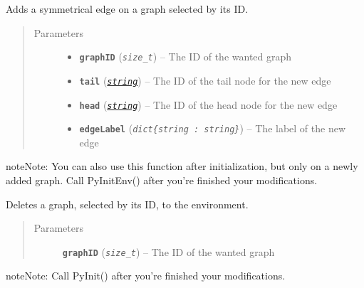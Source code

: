 \documentclass[letterpaper,10pt,english]{sphinxmanual}
\begin{document}
\begin{fulllineitems}
\label{doc:PythonGedLib.PyAddSymmetricalEdge}
Adds a symmetrical edge on a graph selected by its ID.
\begin{quote}\begin{description}
\item[{Parameters}] \leavevmode\begin{itemize}
\item {} 
\textbf{\texttt{graphID}} (\emph{\texttt{size\_t}}) -- The ID of the wanted graph

\item {} 
\textbf{\texttt{tail}} (\href{https://docs.python.org/3/library/string.html\#module-string}{\emph{\texttt{string}}}) -- The ID of the tail node for the new edge

\item {} 
\textbf{\texttt{head}} (\href{https://docs.python.org/3/library/string.html\#module-string}{\emph{\texttt{string}}}) -- The ID of the head node for the new edge

\item {} 
\textbf{\texttt{edgeLabel}} (\emph{\texttt{dict\{string : string\}}}) -- The label of the new edge

\end{itemize}

\end{description}\end{quote}

\begin{notice}{note}{Note:}
You can also use this function after initialization, but only on a newly added graph. Call PyInitEnv() after you're finished your modifications.
\end{notice}

\end{fulllineitems}


\begin{fulllineitems}
\label{doc:PythonGedLib.PyClearGraph}
Deletes a graph, selected by its ID, to the environment.
\begin{quote}\begin{description}
\item[{Parameters}] \leavevmode
\textbf{\texttt{graphID}} (\emph{\texttt{size\_t}}) -- The ID of the wanted graph

\end{description}\end{quote}

\begin{notice}{note}{Note:}
Call PyInit() after you're finished your modifications.
\end{notice}

\end{fulllineitems}
\end{document}
